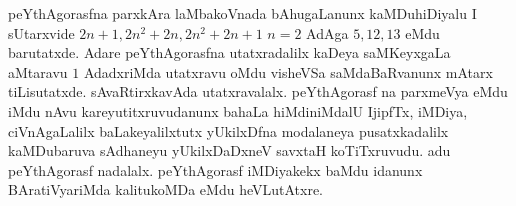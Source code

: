 peYthAgorasfna parxkAra laMbakoVnada bAhugaLanunx kaMDuhiDiyalu I sUtarx\-vide $2n+1, 2n^{2}+2n, 2n^{2}+2n+1$  \quad $n=2$ \;AdAga $5,12,13$ eMdu barutatxde. Adare peYthAgorasfna utatxradalilx kaDeya saMKeyxgaLa aMtaravu $1$ AdadxriMda utatxravu oMdu visheVSa saMdaBaRvanunx mAtarx tiLisutatxde. sAvaRtirxkavAda utatxravalalx. peYthAgorasf na parxmeVya eMdu iMdu nAvu kareyutitxruvudanunx bahaLa hiMdiniMdalU IjipfTx, iMDiya, ciVnAgaLalilx baLakeyalilxtutx yUkilxDfna modalaneya pusatxkadalilx kaMDubaruva sAdhaneyu yUkilxDaDxneV savxtaH koTiTxruvudu. adu peYthAgorasf nadalalx. peYthAgorasf iMDiyakekx baMdu idanunx BAratiVyariMda kalitukoMDa eMdu heVLutAtxre.













